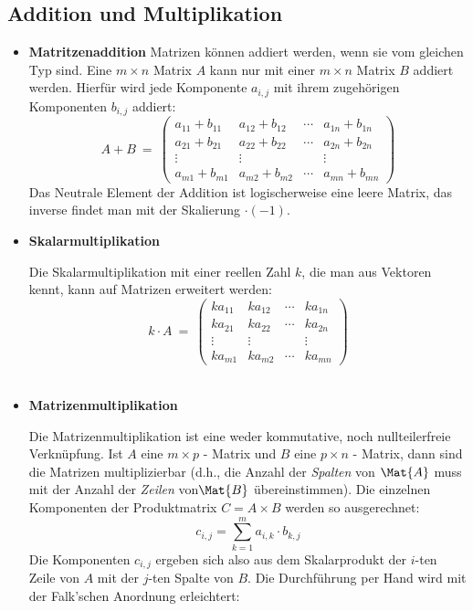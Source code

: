 \documentclass[main.tex]{subfiles}
\begin{document}
\subsection{Addition und Multiplikation}

\begin{itemize}
    \item{\textbf{Matritzenaddition}}
        Matrizen können addiert werden, wenn sie vom gleichen Typ sind. Eine $m\times n$ Matrix $A$ kann nur mit einer $m\times n$ Matrix $B$ addiert werden. Hierfür wird jede Komponente $a_{i,j}$ mit ihrem zugehörigen Komponenten $b_{i,j}$ addiert:
        $$A + B \ = \  \left (
            \begin{array}{cccc}
                a_{11}+ b_{11} & a_{12}+ b_{12} & \cdots & a_{1n}+ b_{1n} \\
                a_{21}+ b_{21} & a_{22}+ b_{22} & \cdots & a_{2n}+ b_{2n} \\
                \vdots & \vdots &  & \vdots \\
                a_{m1}+ b_{m1} & a_{m2}+ b_{m2} & \cdots & a_{mn}+ b_{mn}
            \end{array} \right )$$
        Das Neutrale Element der Addition ist logischerweise eine leere Matrix, das inverse findet man mit der Skalierung $\cdot (-1)$.

    \item{\textbf{Skalarmultiplikation}}

        Die Skalarmultiplikation mit einer reellen Zahl $k$, die man aus Vektoren kennt, kann auf Matrizen erweitert werden:
        $$k\cdot A \ = \ \left (
            \begin{array}{cccc}
                k a_{11} & k a_{12} & \cdots & k a_{1n} \\
                k a_{21} & k a_{22} & \cdots & k a_{2n} \\
                \vdots & \vdots &  & \vdots \\
                k a_{m1} & k a_{m2} & \cdots & k a_{mn}
            \end{array}
            \right ) $$\\

    \item{\textbf{Matrizenmultiplikation}}

        Die Matrizenmultiplikation ist eine weder kommutative, noch nullteilerfreie Verknüpfung. Ist $A$ eine $m\times p$ - Matrix und $B$ eine $p\times n$ - Matrix, dann sind die Matrizen multiplizierbar (d.h., die Anzahl der \textit{Spalten} von $\Mat{A}$ muss mit der Anzahl der \textit{Zeilen} von$\Mat{B}$ übereinstimmen).
        Die einzelnen Komponenten der Produktmatrix $C = A \times B$ werden so ausgerechnet:
        $$c_{i,j} = \sum_{k=1}^{m} a_{i,k} \cdot b_{k,j}$$
        Die Komponenten $c_{i,j}$ ergeben sich also aus dem Skalarprodukt der $i$-ten Zeile von $A$ mit der $j$-ten Spalte von $B$. Die Durchführung per Hand wird mit der Falk'schen Anordnung erleichtert:


\end{itemize}
\end{document}
